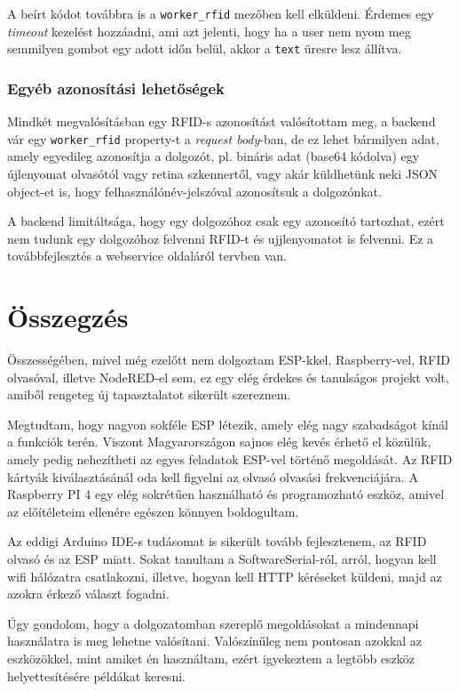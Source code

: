 \documentclass[
]{thesis-ekf}
\theoremstyle{definition}
\theoremstyle{remark}
\begin{document}
A beírt kódot továbbra is a \texttt{worker\_rfid} mezőben kell elküldeni. Érdemes egy \emph{timeout} kezelést hozzáadni, ami azt jelenti, hogy ha a user nem nyom meg semmilyen gombot egy adott időn belül, akkor a \texttt{text} üresre lesz állítva.

\subsection*{Egyéb azonosítási lehetőségek}
Mindkét megvalósításban egy RFID-s azonosítást valósítottam meg, a backend vár egy \texttt{worker\_rfid} property-t a \emph{request body}-ban, de ez lehet bármilyen adat, amely egyedileg azonosítja a dolgozót, pl. bináris adat (base64 kódolva) egy újlenyomat olvasótól vagy retina szkennertől, vagy akár küldhetünk neki JSON object-et is, hogy felhasználónév-jelszóval azonosítsuk a dolgozónkat.

A backend limitáltsága, hogy egy dolgozóhoz csak egy azonosító tartozhat, ezért nem tudunk egy dolgozóhoz felvenni RFID-t és ujjlenyomatot is felvenni. Ez a továbbfejlesztés a webservice oldaláról tervben van.

\chapter*{Összegzés}
Összességében, mivel még ezelőtt nem dolgoztam ESP-kkel, Raspberry-vel, RFID olvasóval, illetve NodeRED-el sem, ez egy elég érdekes és tanulságos projekt volt, amiből rengeteg új tapasztalatot sikerült szereznem.

Megtudtam, hogy nagyon sokféle ESP létezik, amely elég nagy szabadságot kínál a funkciók terén. Viszont Magyarországon sajnos elég kevés érhető el közülük, amely pedig nehezítheti az egyes feladatok ESP-vel történő megoldását. Az RFID kártyák kiválasztásánál oda kell figyelni az olvasó olvasási frekvenciájára. A Raspberry PI 4 egy elég sokrétűen használható és programozható eszköz, amivel az előítéleteim ellenére egészen könnyen boldogultam.

Az eddigi Arduino IDE-s tudásomat is sikerült tovább fejlesztenem, az RFID olvasó és az ESP miatt. Sokat tanultam a SoftwareSerial-ról, arról, hogyan kell wifi hálózatra csatlakozni, illetve, hogyan kell HTTP kéréseket küldeni, majd az azokra érkező választ fogadni.

Úgy gondolom, hogy a dolgozatomban szereplő megoldásokat a mindennapi használatra is meg lehetne valósítani. Valószínűleg nem pontosan azokkal az eszközökkel, mint amiket én használtam, ezért igyekeztem a legtöbb eszköz helyettesítésére példákat keresni.
\end{document}
